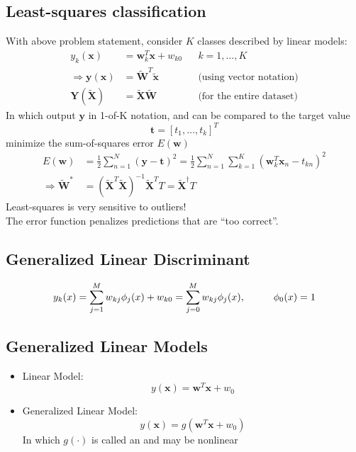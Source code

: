 \subsection{Least-squares classification}
With above problem statement, consider $K$ classes described by linear models:
\begin{align*}
	y_k(\textbf{x}) &= \textbf{w}^T_k\textbf{x} + w_{k0} && k=1, \dots, K \\
	\Rightarrow \textbf{y}(\textbf{x}) &= \widetilde{\textbf{W}}^T\widetilde{\textbf{x}} && \text{(using vector notation)} \\
	\textbf{Y}(\widetilde{\textbf{X}}) &= \widetilde{\textbf{X}}\widetilde{\textbf{W}} && \text{(for the entire dataset)}
\end{align*}
In which output $\textbf{y}$ in 1-of-K notation, and can be compared to the target value
\[\textbf{t}=[t_1, \dots, t_k]^T\]
 minimize the sum-of-squares error $E(\textbf{w})$
\begin{align*}
	E(\textbf{w}) &= \frac{1}{2} \sum_{n=1}^{N} \left(\textbf{y} - \textbf{t}\right)^2 = 
	\frac{1}{2} \sum_{n=1}^{N} \sum_{k=1}^{K} \left(\textbf{w}_k^T\textbf{x}_n-t_{kn}\right)^2 \\
	\Rightarrow \widetilde{\textbf{W}}^* &=  \left( \widetilde{\textbf{X}}^T \widetilde{\textbf{X}} \right)^{-1} \widetilde{\textbf{X}}^T T = \widetilde{\textbf{X}}^\dagger T
\end{align*}
\note Least-squares is very sensitive to outliers!\\
The error function penalizes predictions that are “too correct”.

\subsection{Generalized Linear Discriminant}
\begin{equation}
	y_k(x) = \sum_{j=1}^{M}w_{kj}\phi_j(x) + w_{k0} = \sum_{j=0}^M w_{kj}\phi_j(x), \hspace*{1cm} \phi_0(x) = 1
\end{equation}

\subsection{Generalized Linear Models}
\begin{itemize}
	\item Linear Model:
	\begin{equation}
		y(\textbf{x}) = \textbf{w}^T\textbf{x} + w_0
	\end{equation}	
	\item Generalized Linear Model:
	\begin{equation}
		y(\textbf{x}) = g(\textbf{w}^T\textbf{x} + w_0)
		\label{eq:generalized-linear-model}
	\end{equation}	
	In which $g(\cdot)$ is called an  and may be nonlinear
\end{itemize}

